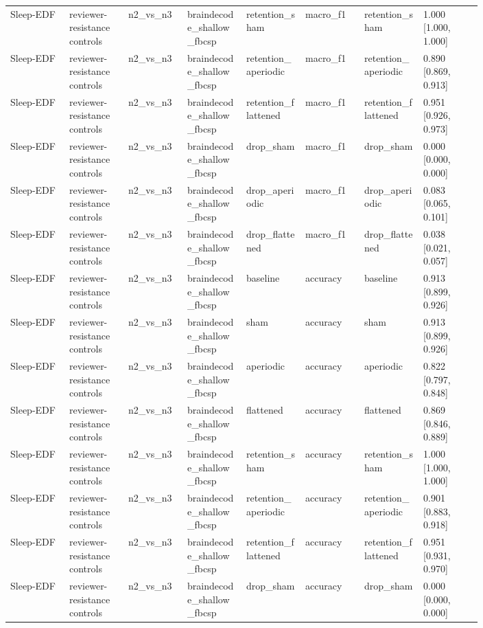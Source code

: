 \begin{longtable}{p{0.10\linewidth}p{0.10\linewidth}p{0.10\linewidth}p{0.10\linewidth}p{0.10\linewidth}p{0.10\linewidth}p{0.10\linewidth}p{0.10\linewidth}}
Sleep-EDF & reviewer-resistance controls & n2\_vs\_n3 & braindecode\_shallow\_fbcsp & retention\_sham & macro\_f1 & retention\_sham & 1.000 [1.000, 1.000]\\
Sleep-EDF & reviewer-resistance controls & n2\_vs\_n3 & braindecode\_shallow\_fbcsp & retention\_aperiodic & macro\_f1 & retention\_aperiodic & 0.890 [0.869, 0.913]\\
Sleep-EDF & reviewer-resistance controls & n2\_vs\_n3 & braindecode\_shallow\_fbcsp & retention\_flattened & macro\_f1 & retention\_flattened & 0.951 [0.926, 0.973]\\
Sleep-EDF & reviewer-resistance controls & n2\_vs\_n3 & braindecode\_shallow\_fbcsp & drop\_sham & macro\_f1 & drop\_sham & 0.000 [0.000, 0.000]\\
Sleep-EDF & reviewer-resistance controls & n2\_vs\_n3 & braindecode\_shallow\_fbcsp & drop\_aperiodic & macro\_f1 & drop\_aperiodic & 0.083 [0.065, 0.101]\\
Sleep-EDF & reviewer-resistance controls & n2\_vs\_n3 & braindecode\_shallow\_fbcsp & drop\_flattened & macro\_f1 & drop\_flattened & 0.038 [0.021, 0.057]\\
Sleep-EDF & reviewer-resistance controls & n2\_vs\_n3 & braindecode\_shallow\_fbcsp & baseline & accuracy & baseline & 0.913 [0.899, 0.926]\\
Sleep-EDF & reviewer-resistance controls & n2\_vs\_n3 & braindecode\_shallow\_fbcsp & sham & accuracy & sham & 0.913 [0.899, 0.926]\\
Sleep-EDF & reviewer-resistance controls & n2\_vs\_n3 & braindecode\_shallow\_fbcsp & aperiodic & accuracy & aperiodic & 0.822 [0.797, 0.848]\\
Sleep-EDF & reviewer-resistance controls & n2\_vs\_n3 & braindecode\_shallow\_fbcsp & flattened & accuracy & flattened & 0.869 [0.846, 0.889]\\
Sleep-EDF & reviewer-resistance controls & n2\_vs\_n3 & braindecode\_shallow\_fbcsp & retention\_sham & accuracy & retention\_sham & 1.000 [1.000, 1.000]\\
Sleep-EDF & reviewer-resistance controls & n2\_vs\_n3 & braindecode\_shallow\_fbcsp & retention\_aperiodic & accuracy & retention\_aperiodic & 0.901 [0.883, 0.918]\\
Sleep-EDF & reviewer-resistance controls & n2\_vs\_n3 & braindecode\_shallow\_fbcsp & retention\_flattened & accuracy & retention\_flattened & 0.951 [0.931, 0.970]\\
Sleep-EDF & reviewer-resistance controls & n2\_vs\_n3 & braindecode\_shallow\_fbcsp & drop\_sham & accuracy & drop\_sham & 0.000 [0.000, 0.000]\\

\end{longtable}
